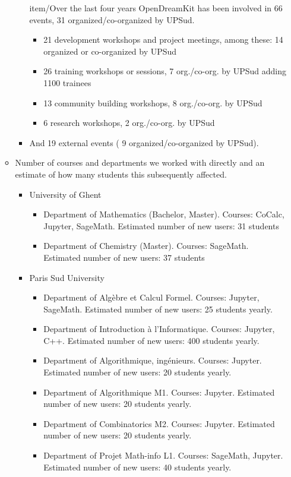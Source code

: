 \begin{enumerate}
\begin{itemize}
\begin{itemize} 
item/Over the last four years OpenDreamKit has been involved in 66 events, 31 organized/co-organized by UPSud.
\begin{itemize} 
\item 21 development workshops and project meetings, among these: 14 organized or co-organized by UPSud
\item 26 training workshops or sessions,  7 org./co-org. by UPSud adding 1100 trainees
\item 13 community building workshops, 8 org./co-org. by UPSud
\item 6 research workshops, 2 org./co-org. by UPSud
\end{itemize} 
\item And 19 external events ( 9 organized/co-organized by UPSud).
\end{itemize}

\item Number of courses and departments we worked with directly and an estimate of how many students this subsequently affected.

\begin{itemize}
  \item University of Ghent
  \begin{itemize}
  \item Department of Mathematics (Bachelor, Master). Courses: CoCalc, Jupyter, SageMath. Estimated number of new users: 31 students
  \item Department of Chemistry (Master). Courses: SageMath. Estimated number of new users: 37 students
   \end{itemize}
   
  \item Paris Sud University 
  \begin{itemize}
   \item Department of Algèbre et Calcul Formel. Courses: Jupyter, SageMath. Estimated number of new users: 25 students yearly.
   \item Department of Introduction à l'Informatique. Courses: Jupyter, C++. Estimated number of new users: 400 students yearly.
   \item Department of Algorithmique, ingénieurs. Courses: Jupyter. Estimated number of new users: 20 students yearly.
   \item Department of Algorithmique M1. Courses: Jupyter. Estimated number of new users: 20 students yearly.
   \item Department of Combinatorics M2. Courses: Jupyter. Estimated number of new users: 20 students yearly.
   \item Department of Projet Math-info L1. Courses: SageMath, Jupyter. Estimated number of new users: 40 students yearly.
     \end{itemize}
     

\end{itemize}
\end{itemize}
\end{enumerate}
